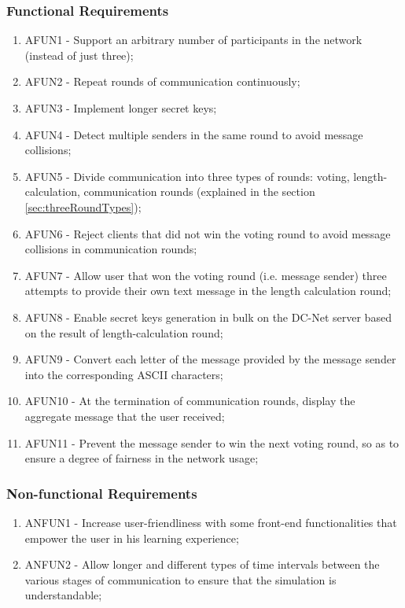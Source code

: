 \subsubsection{Functional Requirements}
\begin{enumerate}
    \item AFUN1 - Support an arbitrary number of participants in the network (instead of just three);
    \item AFUN2 - Repeat rounds of communication continuously;
    \item AFUN3 - Implement longer secret keys;
    \item AFUN4 - Detect multiple senders in the same round to avoid message collisions;
    \item AFUN5 - Divide communication into three types of rounds: voting, length-calculation, communication rounds (explained in the section \ref{sec:threeRoundTypes});
    \item AFUN6 - Reject clients that did not win the voting round to avoid message collisions in communication rounds;
    \item AFUN7 - Allow user that won the voting round (i.e. message sender) three attempts to provide their own text message in the length calculation round;
    \item AFUN8 - Enable secret keys generation in bulk on the DC-Net server based on the result of length-calculation round;
    \item AFUN9 - Convert each letter of the message provided by the message sender into the corresponding ASCII characters;
    \item AFUN10 - At the termination of communication rounds, display the aggregate message that the user received;
    \item AFUN11 - Prevent the message sender to win the next voting round, so as to ensure a degree of fairness in the network usage;
\end{enumerate}

\subsubsection{Non-functional Requirements}
\begin{enumerate}
    \item ANFUN1 - Increase user-friendliness with some front-end functionalities that empower the user in his learning experience;
    \item ANFUN2 - Allow longer and different types of time intervals between the various stages of communication to ensure that the simulation is understandable;
\end{enumerate}

